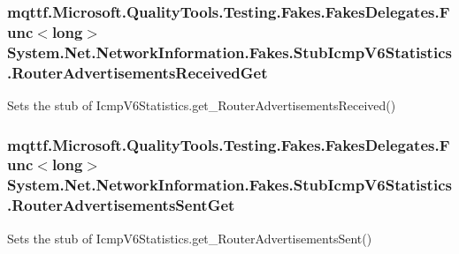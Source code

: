 \hypertarget{class_system_1_1_net_1_1_network_information_1_1_fakes_1_1_stub_icmp_v6_statistics_a7dfd98f072231e388452efbad0372ffd}{
\subsubsection[{Router\-Advertisements\-Received\-Get}]{\setlength{\rightskip}{0pt plus 5cm}mqttf.\-Microsoft.\-Quality\-Tools.\-Testing.\-Fakes.\-Fakes\-Delegates.\-Func$<$long$>$ System.\-Net.\-Network\-Information.\-Fakes.\-Stub\-Icmp\-V6\-Statistics.\-Router\-Advertisements\-Received\-Get}}\label{class_system_1_1_net_1_1_network_information_1_1_fakes_1_1_stub_icmp_v6_statistics_a7dfd98f072231e388452efbad0372ffd}


Sets the stub of Icmp\-V6\-Statistics.\-get\-\_\-\-Router\-Advertisements\-Received()

\hypertarget{class_system_1_1_net_1_1_network_information_1_1_fakes_1_1_stub_icmp_v6_statistics_ae6000e1fd2203b98721d9e2d321faf9e}{
\subsubsection[{Router\-Advertisements\-Sent\-Get}]{\setlength{\rightskip}{0pt plus 5cm}mqttf.\-Microsoft.\-Quality\-Tools.\-Testing.\-Fakes.\-Fakes\-Delegates.\-Func$<$long$>$ System.\-Net.\-Network\-Information.\-Fakes.\-Stub\-Icmp\-V6\-Statistics.\-Router\-Advertisements\-Sent\-Get}}\label{class_system_1_1_net_1_1_network_information_1_1_fakes_1_1_stub_icmp_v6_statistics_ae6000e1fd2203b98721d9e2d321faf9e}


Sets the stub of Icmp\-V6\-Statistics.\-get\-\_\-\-Router\-Advertisements\-Sent()

